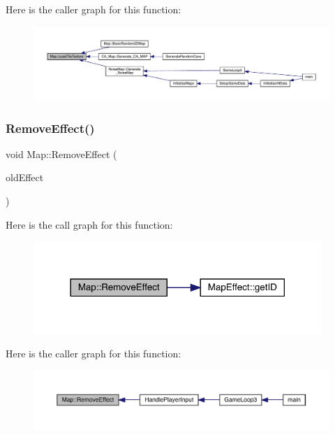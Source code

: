 Here is the caller graph for this function\+:
\nopagebreak
\begin{figure}[H]
\begin{center}
\leavevmode
\includegraphics[width=350pt]{dd/d11/class_map_ab64e7930cd811d847dbbee056b1e2fb0_icgraph}
\end{center}
\end{figure}
\mbox{\label{class_map_a0165980338b5bb5739a05dee4d4b341b}} 
\subsubsection{\texorpdfstring{Remove\+Effect()}{RemoveEffect()}}
{\footnotesize\ttfamily void Map\+::\+Remove\+Effect (\begin{DoxyParamCaption}\item[{\mbox{\hyperlink{class_map_effect}{Map\+Effect}}}]{old\+Effect }\end{DoxyParamCaption})}

Here is the call graph for this function\+:\nopagebreak
\begin{figure}[H]
\begin{center}
\leavevmode
\includegraphics[width=310pt]{dd/d11/class_map_a0165980338b5bb5739a05dee4d4b341b_cgraph}
\end{center}
\end{figure}
Here is the caller graph for this function\+:\nopagebreak
\begin{figure}[H]
\begin{center}
\leavevmode
\includegraphics[width=350pt]{dd/d11/class_map_a0165980338b5bb5739a05dee4d4b341b_icgraph}
\end{center}
\end{figure}
\mbox{\label{class_map_a2b24578b19c64fd8bc94ab2f36ffb9fc}} 
